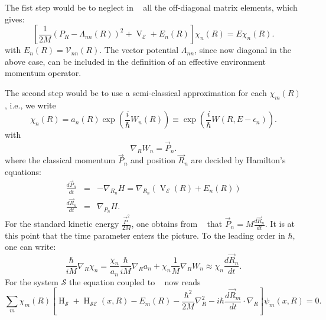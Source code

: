 The fist step would be to neglect in ~  all the off-diagonal
matrix elements, which gives:
\begin{equation}
\label{eq:chap2_no_off_diag}
    \left[ \frac{1}{2M} \left(P_R -  
    \Lambda_{nn}(R)\right)^2 + \operatorname{V}_{\mathcal{E}} + E_n(R) \right] \chi_n(R) = E \chi_n(R).
\end{equation}
with \(E_n(R) = \mathcal{V}_{nn}(R) \). The vector potential \(\Lambda_{nn}\), since now diagonal in the above case, can be included in the
definition of an effective environment momentum operator. 

The second step would be to use a semi-classical approximation for each \(\chi_m(R)\), i.e., we write
\begin{equation}
\label{eqn:chap2_WKB_clc}
    \chi_{n}(R) = a_n(R) \exp\left(\frac{i}{\hbar} W_n(R)\right) \equiv \exp\left(\frac{i}{\hbar} W(R, E - \epsilon_n)\right) .
\end{equation}
with
\begin{equation}
    \label{eqn:chap2_clc_action}
    \nabla _R W_n = \vec{P}_n.
\end{equation}
where the classical momentum 
\(\vec{P}_n\) and position \(\vec{R}_n\) are decided by Hamilton's equations:
\begin{eqnarray}
    \label{eqn:chap2_hamilton_eqns1}
    \frac{d\vec{P}_n}{dt} &=& -\nabla_{{R}_n} H = \nabla_{R_n}\left( \operatorname{V}_{\mathcal{E}}(R) + E_n(R)\right)\\
    \label{eqn:chap2_hamilton_eqns2}
    \frac{d\vec{R}_n}{dt} &=& \nabla_{{P}_n} H.
\end{eqnarray}
For the standard kinetic energy \(\frac{\vec{P}^2}{2M}\), one obtains from 
~ that \(\vec{P}_n = M\frac{d\vec{R}_n}{dt}\). It is at this point
that the time parameter enters the picture. To the leading order in \(\hbar\), one can write:
\begin{equation}
    \frac{\hbar}{iM} \nabla_R \chi_n = \frac{\chi_n}{a_n} \frac{\hbar}{iM} \nabla _R a_n + 
    \chi_n \frac{1}{M} \nabla_R W_n \approx \chi_n \frac{d\vec{R}_n}{dt}.
\end{equation}
For the system \(\mathcal{S}\) the equation coupled to ~ now reads
\begin{equation}
    \label{eqn:chap2_system_evol_mod2}
    \sum_{m} \chi_m(R) \left[
    \operatorname{H}_{\mathcal{S}} + \operatorname{H}_{\mathcal{SE}}(x, R)  - E_m(R)  - \frac{\hbar^2}{2M}\nabla^2 _R -
    i\hbar \frac{d \vec{R}_m}{dt} \cdot \nabla_R \right] \psi_m (x, R)= 0.
\end{equation}
